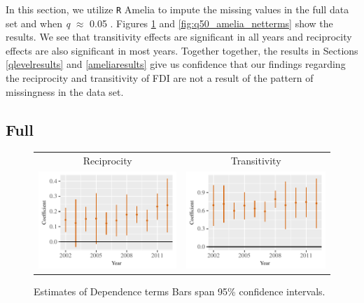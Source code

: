 \documentclass[reqno,onecolumn,letterpaper,12pt]{article}
\newcommand{\R}{\texttt{R}} %
\begin{document}
{In this section, we utilize \R{} Amelia to impute the missing values in the full data set and  when \emph{q} $\approx$ 0.05 \citep{King_et_al:2001,honaker2011amelia}. Figures \ref{fig:full_amelia_netterms} and \ref{fig:q50_amelia_netterms} show the results. We see that transitivity effects are significant in all years and reciprocity effects are also significant in most years. Together together, the results in Sections \ref{qlevelresults} and \ref{ameliaresults} give us confidence that our findings regarding the reciprocity and transitivity of FDI are not a result of the pattern of missingness in the data set.

\subsection{Full}

\begin{figure}[!h]
\centering
\begin{tabular}{c@{\hskip 0cm}c}
Reciprocity & Transitivity \\
\includegraphics[height=.2\textheight, clip=true, trim=0cm 0cm 0cm .2cm]{draft_figures/rl_amelia_full/Mutuality.pdf}    &
\includegraphics[height=.2\textheight, clip=true, trim=0cm 0cm 0cm .2cm]{draft_figures/rl_amelia_full/Transitivity.pdf}
\end{tabular}
\caption{\label{fig:full_amelia_netterms} Estimates of Dependence terms Bars span 95\% confidence intervals. }
\end{figure}








}
\end{document}
